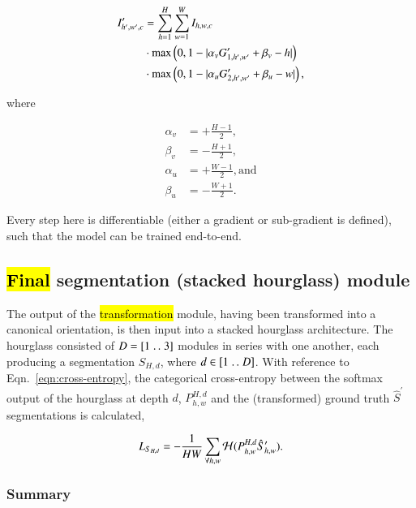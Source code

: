 $$
\begin{aligned}
I^\prime_{h',w',c} & = \sum^H_{h=1}\sum^W_{w=1}I_{h, w, c} \\
                  & \cdot \max\left(0, 1-|\alpha_v G^\prime_{1, h', w'} + \beta_v - h| \right) \\
                  & \cdot \max\left(0, 1-|\alpha_u G^\prime_{2, h', w'} + \beta_u - w| \right),
\end{aligned}
$$

\noindent where

$$
\begin{aligned}
\alpha_v & = +\frac{H-1}{2},               \\
\beta_v  & = -\frac{H+1}{2},              \\
\alpha_u & = +\frac{W-1}{2}, \mathrm{ and} \\
\beta_u  & = - \frac{W+1}{2}.
\end{aligned}
$$

\noindent Every step here is differentiable (either a gradient or sub-gradient is defined), such that the model can be trained end-to-end.

\subsection{\hl{Final} segmentation (stacked hourglass) module}\label{sec:hourglass}

The output of the \hl{transformation} module, having been transformed into a canonical orientation, is then input into a stacked hourglass architecture.
The hourglass consisted of $D = [1 \mathrel{{.}\,{.}}\nobreak 3]$ \UNet{} modules in series with one another, each producing a segmentation $S_{H,d}$, where $d \in [1 \mathrel{{.}\,{.}}\nobreak D]$.
With reference to Eqn.~\eqref{eqn:cross-entropy}, the categorical cross-entropy between the softmax output of the hourglass at depth $d$, $P^{H,d}_{h,w}$ and the (transformed) ground truth $\hat{S}^\prime$ segmentations is calculated,

\begin{equation}\label{eqn:hourglass-loss}
L_{S_{H,d}} = -\frac{1}{HW} \sum_{\forall h,w} \mathcal{H}(P^{H,d}_{h,w}\hat{S}^\prime_{h,w}).
\end{equation}

\subsubsection{Summary}

